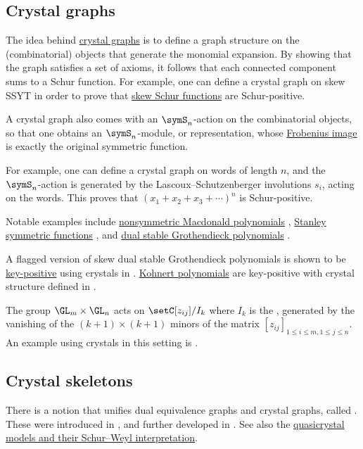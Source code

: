 \subsection[schurPositivityCrystals]{Crystal graphs}

The idea behind \hyperref[crystals]{crystal graphs} is to define a graph structure
on the (combinatorial) objects that generate the monomial expansion.
By showing that the graph satisfies a set of axioms, it follows that each
connected component sums to a Schur function.
For example, one can define a crystal graph on skew SSYT
in order to prove that \hyperref[schurSkew]{skew Schur functions} are Schur-positive.

A crystal graph also comes with an $\symS_n$-action on the combinatorial objects,
so that one obtains an $\symS_n$-module, or representation,
whose \hyperref[frobeniusCharacteristic]{Frobenius image} is exactly the
original symmetric function.

For example, one can define a crystal graph on words of length $n$, and
the $\symS_n$-action is generated by the Lascoux--Schutzenberger involutions $s_i$,
acting on the words. This proves that $(x_1+x_2+x_3+\dotsb)^n$ is Schur-positive.

Notable examples include \hyperref[macdonaldE]{nonsymmetric Macdonald
polynomials} \cite{AssafGonzalez2018},
\hyperref[stanleySym]{Stanley symmetric functions} \cite{MorseSchilling2015},
and \hyperref[grothendieckDualStable]{dual stable Grothendieck polynomials}
\cite{Galashin2017}.


A flagged version of skew dual stable Grothendieck polynomials is shown to be
\hyperref[key]{key-positive}
using crystals in \cite{Kundu2023x}.
\hyperref[kohnert]{Kohnert polynomials} are key-positive with crystal
structure defined in \cite{Assaf2021}.


The group $\GL_m \times \GL_n$ acts on $\setC[z_{ij}] / I_k$ where $I_k$ is
the \label{determinantalVarietyDefinition},
generated by the vanishing of the $(k+1) \times (k+1)$ minors of the matrix
$[z_{ij}]_{1 \leq i \leq m, 1 \leq j \leq n}$.
An example using crystals in this setting is \cite{PriceStelzerYong2025x}.




\subsection[schurPositivityCrystalSkeletons]{Crystal skeletons}

There is a notion that unifies dual equivalence graphs and crystal graphs,
called . These were introduced in \cite{MaasGariepy2023x},
and further developed in \cite{BraunerCorteelDaughertySchilling2025x}.
See also the \hyperref[quasiCrystals]{quasicrystal models and their
Schur--Weyl interpretation}.

